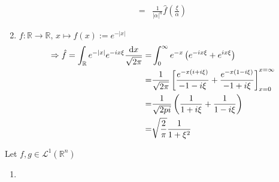 \begin{example}
\begin{enumerate}
\begin{align}
            =& \frac{1}{|\alpha|^n} \hat{f} \left( \frac{\xi}{\alpha} \right)
        \end{align}
        \item \(f: \mathbb{R} \rightarrow \mathbb{R}, \, x \mapsto f(x) := e^{-|x|}\)
        \begin{align}
            \Rightarrow \hat{f} = \int_{\mathbb{R}} e^{-|x|} e^{-ix\xi} \frac{\mathop{}\!\mathrm{d} x}{\sqrt{2 \pi}} =& \int_0^\infty e^{-x} \left( e^{-ix\xi} + e^{ix\xi} \right) \\
            =& \frac{1}{\sqrt{2\pi}} \left[ \frac{e^{-x(i + i\xi)}}{-1-i\xi} + \frac{e^{-x(1-i\xi)}}{-1+i\xi} \right]_{x=0}^{x=\infty} \\
            =& \frac{1}{\sqrt{2pi}} \left(\frac{1}{1 + i\xi} + \frac{1}{1-i\xi}\right) \\
            =& \sqrt{\frac{2}{\pi}} \frac{1}{1 + \xi^2}
        \end{align}
    \end{enumerate}
\end{example}
\begin{proposition}
    Let \(f, g \in \mathcal{L}^1 (\mathbb{R}^n)\)
    \begin{enumerate}
        \item 
    \end{enumerate}
\end{proposition}